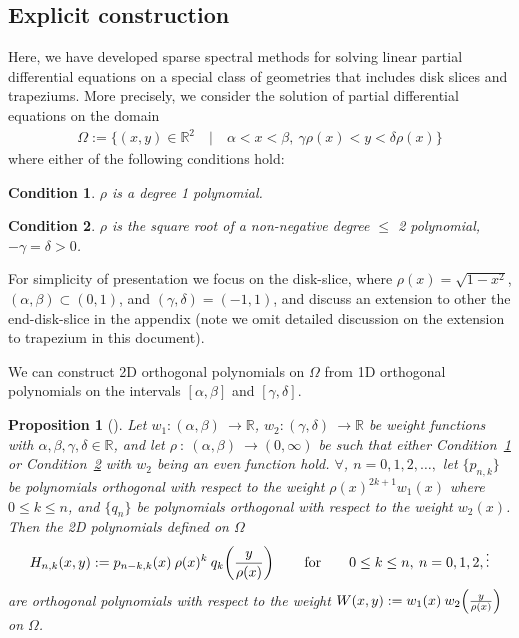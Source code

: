 \documentclass[11pt, oneside]{article}   	%
\newcommand{\R}{\mathbb{R}}
\newcommand{\hdop}{H}
\newcommand{\hdopnk}{\hdop_{n,k}}
\newtheorem{proposition}{Proposition}
\newtheorem{condition}{Condition}
\def\condref#1{Condition~\ref{cond:#1}}
\begin{document}
\subsection{Explicit construction}

Here, we have developed sparse spectral methods for solving linear partial differential equations on a special class of geometries that includes disk slices and trapeziums. More precisely, we consider the solution of partial differential equations on the domain
\begin{align}
	\Omega := \{(x,y) \in \R^2 \quad | \quad \alpha < x < \beta, \: \gamma \rho(x) < y < \delta \rho(x)\} \label{eqn:domaindef}
\end{align}
where either of the following conditions hold:

\begin{condition}\label{cond:trap}
 \(\rho\) is a degree 1 polynomial.
 \end{condition}
 
 \begin{condition}\label{cond:disk}
\(\rho\) is the square root of a non-negative degree \(\le\) 2 polynomial, \(-\gamma = \delta > 0\).
\end{condition}


For simplicity of presentation we focus on the disk-slice, where $\rho(x) = \sqrt{1-x^2}$, $(\alpha,\beta) \subset (0, 1)$, and $(\gamma, \delta)  = (-1,1)$, and discuss an extension to other the end-disk-slice in the appendix (note we omit detailed discussion  on the extension to trapezium in this document). 

We can construct 2D orthogonal polynomials on $\Omega$ from 1D orthogonal polynomials on the intervals \([\alpha,\beta]\) and \([\gamma,\delta]\). 

\begin{proposition}[{\cite[p55--56]{dunkl2014orthogonal}}]\label{prop:construction}
Let \(w_1 : (\alpha,\beta) \: \to \R\), \(w_2 : (\gamma,\delta) \: \to \R\) be weight functions with \(\alpha,\beta,\gamma,\delta \in \R\), and let \(\rho \: : \: (\alpha,\beta) \: \to (0,\infty)\) be such that either \condref{trap} or \condref{disk} with \(w_2\) being an even function hold.
$\forall$, $n = 0,1,2,\dots, $ let $\{p_{n,k}\}$ be polynomials orthogonal with respect to the weight $\rho(x)^{2k+1} w_1(x)$ where $0 \le k \le n$, and $\{q_{n}\}$ be polynomials orthogonal with respect to the weight $w_2(x)$. Then the 2D polynomials defined on $\Omega$
$$
\hdopnk(x,y) := p_{n-k,k}(x) \: \rho(x)^k \: q_k\fpr(\frac{y}{\rho(x)}) \qquad\hbox{for} \qquad 0 \le k \le n, \: n = 0,1,2,\dots
$$
are orthogonal polynomials with respect to the weight \(W(x,y) := w_1(x) \: w_2\fpr(\frac{y}{\rho(x)}) \) on $\Omega$. 
\end{proposition}
\end{document}
